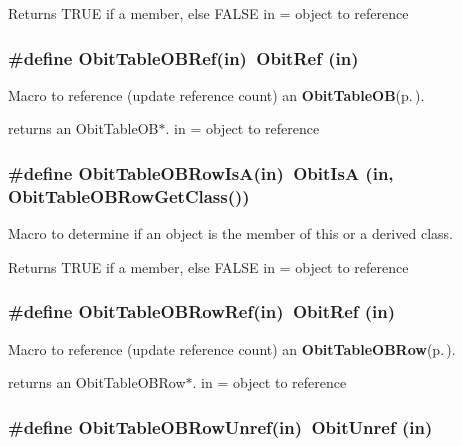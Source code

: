 Returns TRUE if a member, else FALSE in = object to reference 
\subsubsection{\setlength{\rightskip}{0pt plus 5cm}\#define Obit\-Table\-OBRef(in)\ Obit\-Ref (in)}\label{ObitTableOB_8h_a2}


Macro to reference (update reference count) an {\bf Obit\-Table\-OB}{\rm (p.\,\pageref{structObitTableOB})}. 

returns an Obit\-Table\-OB$\ast$. in = object to reference 
\subsubsection{\setlength{\rightskip}{0pt plus 5cm}\#define Obit\-Table\-OBRow\-Is\-A(in)\ Obit\-Is\-A (in, Obit\-Table\-OBRow\-Get\-Class())}\label{ObitTableOB_8h_a6}


Macro to determine if an object is the member of this or a derived class. 

Returns TRUE if a member, else FALSE in = object to reference 
\subsubsection{\setlength{\rightskip}{0pt plus 5cm}\#define Obit\-Table\-OBRow\-Ref(in)\ Obit\-Ref (in)}\label{ObitTableOB_8h_a5}


Macro to reference (update reference count) an {\bf Obit\-Table\-OBRow}{\rm (p.\,\pageref{structObitTableOBRow})}. 

returns an Obit\-Table\-OBRow$\ast$. in = object to reference 
\subsubsection{\setlength{\rightskip}{0pt plus 5cm}\#define Obit\-Table\-OBRow\-Unref(in)\ Obit\-Unref (in)}\label{ObitTableOB_8h_a4}


